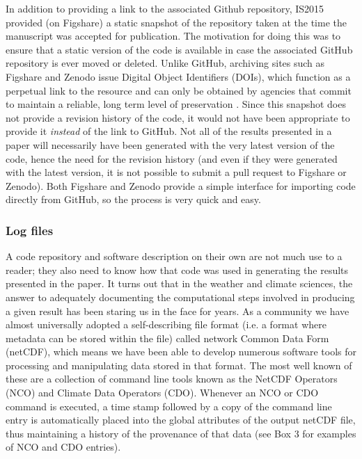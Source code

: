 In addition to providing a link to the associated Github repository, IS2015 provided (on Figshare) a static snapshot of the repository taken at the time the manuscript was accepted for publication. The motivation for doing this was to ensure that a static version of the code is available in case the associated GitHub repository is ever moved or deleted. Unlike GitHub, archiving sites such as Figshare and Zenodo issue Digital Object Identifiers (DOIs), which function as a perpetual link to the resource and can only be obtained by agencies that commit to maintain a reliable, long term level of preservation \citep{Potter2015}. Since this snapshot does not provide a revision history of the code, it would not have been appropriate to provide it \textit{instead} of the link to GitHub. Not all of the results presented in a paper will necessarily have been generated with the very latest version of the code, hence the need for the revision history (and even if they were generated with the latest version, it is not possible to submit a pull request to Figshare or Zenodo). Both Figshare and Zenodo provide a simple interface for importing code directly from GitHub, so the process is very quick and easy.

\subsubsection{Log files}\label{s:log_files}

A code repository and software description on their own are not much use to a reader; they also need to know how that code was used in generating the results presented in the paper. It turns out that in the weather and climate sciences, the answer to adequately documenting the computational steps involved in producing a given result has been staring us in the face for years. As a community we have almost universally adopted a self-describing file format (i.e. a format where metadata can be stored within the file) called network Common Data Form (netCDF), which means we have been able to develop numerous software tools for processing and manipulating data stored in that format. The most well known of these are a collection of command line tools known as the NetCDF Operators (NCO) and Climate Data Operators (CDO). Whenever an NCO or CDO command is executed, a time stamp followed by a copy of the command line entry is automatically placed into the global attributes of the output netCDF file, thus maintaining a history of the provenance of that data (see Box 3 for examples of NCO and CDO entries).

